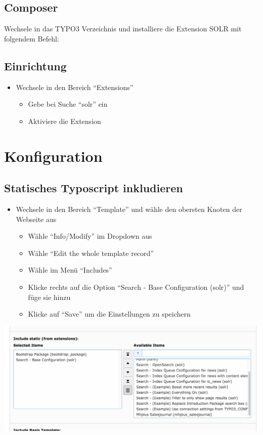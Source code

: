 \documentclass[]{book}
\providecommand{\tightlist}{%
  \setlength{\itemsep}{0pt}\setlength{\parskip}{0pt}}
\begin{document}
\section{Composer}

Wechsele in das TYPO3 Verzeichnis und installiere die Extension SOLR mit
folgendem Befehl:

\section{Einrichtung}

\begin{itemize}
\tightlist
\item
  Wechsele in den Bereich ``Extensions''

  \begin{itemize}
  \tightlist
  \item
    Gebe bei Suche ``solr'' ein
  \item
    Aktiviere die Extension
  \end{itemize}
\end{itemize}

\chapter{Konfiguration}

\section{Statisches Typoscript inkludieren}

\begin{itemize}
\tightlist
\item
  Wechsele in den Bereich ``Template'' und wähle den obersten Knoten der
  Webseite aus

  \begin{itemize}
  \tightlist
  \item
    Wähle ``Info/Modify'' im Dropdown aus
  \item
    Wähle ``Edit the whole template record''
  \item
    Wähle im Menü ``Includes''
  \item
    Klicke rechts auf die Option ``Search - Base Configuration (solr)''
    und füge sie hinzu
  \item
    Klicke auf ``Save'' um die Einstellungen zu speichern
  \end{itemize}
\end{itemize}

\includegraphics{images/static_typoscript.png}
\end{document}
